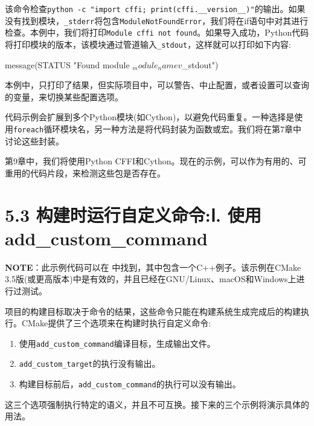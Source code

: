 该命令检查\texttt{python -c "import cffi; print(cffi.\_\_version\_\_)"}的输出。如果没有找到模块，\texttt{\_stderr}将包含\texttt{ModuleNotFoundError}，我们将在if语句中对其进行检查。本例中，我们将打印\texttt{Module cffi not found}。如果导入成功，Python代码将打印模块的版本，该模块通过管道输入\texttt{\_stdout}，这样就可以打印如下内容:

\begin{codebox}[cmake]
message(STATUS "Found module ${_module_name} v${_stdout}")
\end{codebox}


本例中，只打印了结果，但实际项目中，可以警告、中止配置，或者设置可以查询的变量，来切换某些配置选项。

代码示例会扩展到多个Python模块(如Cython)，以避免代码重复。一种选择是使用\texttt{foreach}循环模块名，另一种方法是将代码封装为函数或宏。我们将在第7章中讨论这些封装。

第9章中，我们将使用Python CFFI和Cython。现在的示例，可以作为有用的、可重用的代码片段，来检测这些包是否存在。


\section{5.3 构建时运行自定义命令:Ⅰ. 使用add\_custom\_command}

\begin{myInfoBox}
\textbf{NOTE}：此示例代码可以在  中找到，其中包含一个C++例子。该示例在CMake 3.5版(或更高版本)中是有效的，并且已经在GNU/Linux、macOS和Windows上进行过测试。
\end{myInfoBox}

项目的构建目标取决于命令的结果，这些命令只能在构建系统生成完成后的构建执行。CMake提供了三个选项来在构建时执行自定义命令:

\begin{enumerate}
\item 使用\texttt{add\_custom\_command}编译目标，生成输出文件。

\item \texttt{add\_custom\_target}的执行没有输出。

\item 构建目标前后，\texttt{add\_custom\_command}的执行可以没有输出。

\end{enumerate}

这三个选项强制执行特定的语义，并且不可互换。接下来的三个示例将演示具体的用法。

